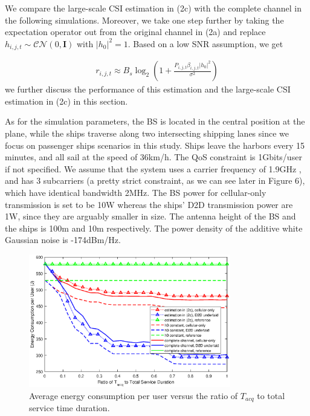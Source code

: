 \documentclass{ieeeaccess}
\begin{document}
We compare the large-scale CSI estimation in (2c) with the complete channel in the following simulations. Moreover, we take one step further by taking the expectation operator out from the original channel in (2a) and replace ${h_{i,j,t}} \sim \mathcal{CN}(0, \mathbf{I})$ with ${\left| {{h_0}} \right|^2} = 1$. Based on a low SNR assumption, we get 

\begin{align}
{r_{i,j,t}} \approx {B_s}{\log _2}\left( {1 + \frac{{{P_{i,j,t}}{\beta _{i,j,t}}{{\left| {{h_0}} \right|}^2}}}{{{\sigma ^2}}}} \right)
\end{align}
we further discuss the performance of this estimation and the large-scale CSI estimation in (2c) in this section.

As for the simulation parameters, the BS is located in the central position at the plane, while the ships traverse along two intersecting shipping lanes since we focus on passenger ships scenarios in this study. 
Ships leave the harbors every 15 minutes, and all sail at the speed of 36km/h. The QoS constraint is 1Gbits/user if not specified. We assume that the system uses a carrier frequency of 1.9GHz , and has 3 subcarriers (a pretty strict constraint, as we can see later in Figure 6), which have identical bandwidth 2MHz. The BS power for cellular-only transmission is set to be 10W whereas the ships' D2D transmission power are 1W, since they are arguably smaller in size. The antenna height of the BS and the ships is 100m and 10m respectively. The power density of the additive white Gaussian noise is -174dBm/Hz.


\begin{figure} [htb]
\includegraphics*[width=8.8cm]{Tranges.eps}
\caption{Average energy consumption per user versus the ratio of ${T_{acq}}$ to total service time duration.} \label{fig:4}
\end{figure}
\end{document}
